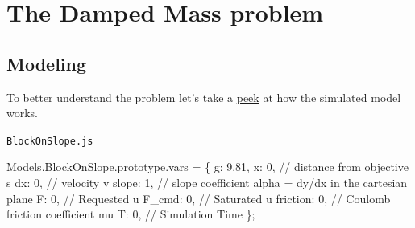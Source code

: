 \documentclass[
  8pt,
  a4paper,
]{book}
\newenvironment{Shaded}{\begin{snugshade}}{\end{snugshade}}
\newcommand{\AttributeTok}[1]{\textcolor[rgb]{0.40,0.45,0.13}{#1}}
\newcommand{\CommentTok}[1]{\textcolor[rgb]{0.37,0.37,0.37}{#1}}
\newcommand{\DataTypeTok}[1]{\textcolor[rgb]{0.68,0.00,0.00}{#1}}
\newcommand{\DecValTok}[1]{\textcolor[rgb]{0.68,0.00,0.00}{#1}}
\newcommand{\FloatTok}[1]{\textcolor[rgb]{0.68,0.00,0.00}{#1}}
\newcommand{\NormalTok}[1]{\textcolor[rgb]{0.00,0.23,0.31}{#1}}
\newcommand{\OperatorTok}[1]{\textcolor[rgb]{0.37,0.37,0.37}{#1}}
\newcommand*\circled[1]{\tikz[baseline=(char.base)]{
          \node[shape=circle,draw,inner sep=1pt] (char) {{\scriptsize#1}};}}
\begin{document}
\chapter{The Damped Mass problem}\label{the-damped-mass-problem}

\section{Modeling}\label{modeling}

To better understand the problem let's take a
\href{https://github.com/janismac/ControlChallenges/blob/gh-pages/js/models/BlockOnSlope.js}{peek}
at how the simulated model works.

\begin{codelisting}

\caption{\texttt{BlockOnSlope.js}}

\label{annotated-cell-3}%
\begin{Shaded}
\begin{Highlighting}[]
\NormalTok{Models}\OperatorTok{.}\AttributeTok{BlockOnSlope}\OperatorTok{.}\AttributeTok{prototype}\OperatorTok{.}\AttributeTok{vars} \OperatorTok{=} 
\NormalTok{\{ }\hspace*{\fill}\NormalTok{\circled{1}}
    \DataTypeTok{g}\OperatorTok{:} \FloatTok{9.81}\OperatorTok{,}
    \DataTypeTok{x}\OperatorTok{:} \DecValTok{0}\OperatorTok{,}          \CommentTok{// distance from objective s}
    \DataTypeTok{dx}\OperatorTok{:} \DecValTok{0}\OperatorTok{,}         \CommentTok{// velocity v}
    \DataTypeTok{slope}\OperatorTok{:} \DecValTok{1}\OperatorTok{,}      \CommentTok{// slope coefficient alpha = dy/dx in the cartesian plane}
    \DataTypeTok{F}\OperatorTok{:} \DecValTok{0}\OperatorTok{,}          \CommentTok{// Requested u}
    \DataTypeTok{F\_cmd}\OperatorTok{:} \DecValTok{0}\OperatorTok{,}      \CommentTok{// Saturated u}
    \DataTypeTok{friction}\OperatorTok{:} \DecValTok{0}\OperatorTok{,}   \CommentTok{// Coulomb friction coefficient mu}
    \DataTypeTok{T}\OperatorTok{:} \DecValTok{0}\OperatorTok{,}          \CommentTok{// Simulation Time}
\NormalTok{\}}\OperatorTok{;}


\end{Highlighting}
\end{Shaded}
\end{codelisting}
\end{document}
